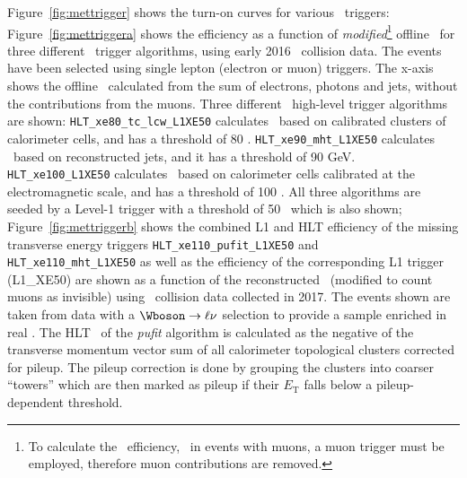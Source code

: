 				Figure~\ref{fig:mettrigger} shows the turn-on curves for various \met\ triggers: Figure~\ref{fig:mettriggera} shows the efficiency as a function of \textit{modified}\footnote{To calculate the \met\ efficiency, \eg\ in events with muons, a muon trigger must be employed, therefore muon contributions are removed.} offline \met\ for three different \met\ trigger algorithms, using early 2016 \pp\ collision data. The events have been selected using single lepton (electron or muon) triggers. The x-axis shows the offline \met\ calculated from the sum of electrons, photons and jets, without the contributions from the muons. Three different \met\ high-level trigger algorithms are shown: \texttt{HLT\_xe80\_tc\_lcw\_L1XE50} calculates \met\ based on calibrated clusters of calorimeter cells, and has a threshold of 80 \GeV. \texttt{HLT\_xe90\_mht\_L1XE50} calculates \met\ based on reconstructed jets, and it has a threshold of 90 GeV. \texttt{HLT\_xe100\_L1XE50} calculates \met\ based on calorimeter cells calibrated at the electromagnetic scale, and has a threshold of 100 \GeV. All three algorithms are seeded by a Level-1 trigger with a threshold of 50 \GeV\ which is also shown; Figure~\ref{fig:mettriggerb} shows the combined \ac{L1} and \ac{HLT} efficiency of the missing transverse energy triggers \texttt{HLT\_xe110\_pufit\_L1XE50} and \\ \texttt{HLT\_xe110\_mht\_L1XE50} as well as the efficiency of the corresponding \ac{L1} trigger (L1\_XE50) are shown as a function of the reconstructed \met\ (modified to count muons as invisible) using \pp\ collision data collected in 2017. The events shown are taken from data with a $\Wboson \to \ell \nu$ selection to provide a sample enriched in real \met. The \ac{HLT} \met\ of the \textit{pufit} algorithm is calculated as the negative of the transverse momentum vector sum of all calorimeter topological clusters corrected for pileup. The pileup correction is done by grouping the clusters into coarser “towers” which are then marked as pileup if their $E_\mathrm{T}$ falls below a pileup-dependent threshold.

